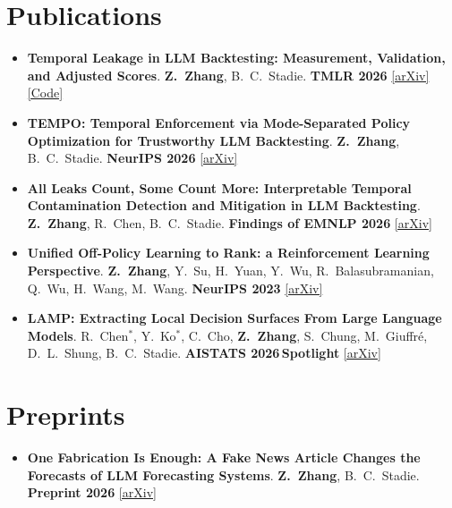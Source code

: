 \documentclass[10.5pt]{article}
\newcommand{\chip}[1]{{\setlength{\fboxsep}{2.2pt}\colorbox{chipbg}{\scriptsize\bfseries\textcolor{accent}{#1}}}}
\newenvironment{publist}
  {\begin{itemize}[leftmargin=1.35em, topsep=2.5pt, itemsep=7pt, parsep=0pt,
                   label=\textcolor{accent}{\footnotesize$\bullet$}]\small}
  {\end{itemize}}
\newcommand{\me}{\textbf{Z.\ Zhang}}
\newcommand{\cpub}[4]{\item \textbf{#1}. #2.\; #3\; {\footnotesize #4}}
\begin{document}
\section{Publications}
\begin{publist}
  \cpub{Temporal Leakage in LLM Backtesting: Measurement, Validation, and Adjusted Scores}
       {\me, B.\ C.\ Stadie}{\chip{TMLR 2026}}{\href{https://arxiv.org/abs/2608.02985}{[arXiv]}
        \href{https://github.com/ZeyuZhang1901/Temporal-Leakage-Backtesting}{[Code]}}
  \cpub{TEMPO: Temporal Enforcement via Mode-Separated Policy Optimization for Trustworthy LLM Backtesting}
       {\me, B.\ C.\ Stadie}{\chip{NeurIPS 2026}}{\href{https://arxiv.org/abs/2605.18843}{[arXiv]}}
  \cpub{All Leaks Count, Some Count More: Interpretable Temporal Contamination Detection and Mitigation in LLM Backtesting}
       {\me, R.\ Chen, B.\ C.\ Stadie}{\chip{Findings of EMNLP 2026}}{\href{https://arxiv.org/abs/2602.17234}{[arXiv]}}
  \cpub{Unified Off-Policy Learning to Rank: a Reinforcement Learning Perspective}
       {\me, Y.\ Su, H.\ Yuan, Y.\ Wu, R.\ Balasubramanian, Q.\ Wu, H.\ Wang, M.\ Wang}
       {\chip{NeurIPS 2023}}{\href{https://arxiv.org/abs/2306.07528}{[arXiv]}}
  \cpub{LAMP: Extracting Local Decision Surfaces From Large Language Models}
       {R.\ Chen$^*$, Y.\ Ko$^*$, C.\ Cho, \me, S.\ Chung, M.\ Giuffr\'e, D.\ L.\ Shung, B.\ C.\ Stadie}
       {\chip{AISTATS 2026}\,\chip{Spotlight}}{\href{https://arxiv.org/abs/2505.11772}{[arXiv]}}
\end{publist}

\section{Preprints}
\begin{publist}
  \cpub{One Fabrication Is Enough: A Fake News Article Changes the Forecasts of LLM Forecasting Systems}
       {\me, B.\ C.\ Stadie}{\chip{Preprint 2026}}{\href{https://arxiv.org/abs/2611.15102}{[arXiv]}}
\end{publist}

\end{document}
